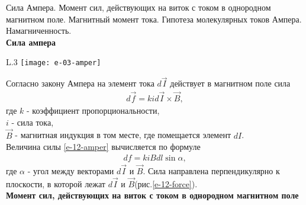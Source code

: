 \documentclass[__main__.tex]{subfiles}
\begin{document}
Сила Ампера. Момент сил, действующих на виток с током в однородном магнитном поле. Магнитный момент тока. Гипотеза молекулярных токов Ампера. Намагниченность.\\ 

\textbf{Сила ампера}\\

\begin{wrapfigure}{L}{.3\linewidth}
	\texttt{[image: e-03-amper]}
	\caption{Сила Ампера}
	\label{e-12-force}
\end{wrapfigure}
Согласно закону Ампера на элемент тока $d\vec{I}$ действует в магнитном поле сила
\begin{gather}
d\vec{f} = kid\vec{I} \times \vec{B},
\label{e-12-amper}
\end{gather}
где $k$ - коэффициент пропорциональности,\\
$i$ - сила тока,\\
$\vec{B}$ - магнитная индукция в том месте, где помещается элемент $dI$.\\
Величина силы \ref{e-12-amper} вычисляется по формуле 
\begin{gather}
df = kiBdl\sin{\alpha},
\end{gather}
где $\alpha$ - угол между векторами $d\vec{I}$ и $\vec{B}$. Сила направлена перпендикулярно к плоскости, в которой лежат $d\vec{I}$ и $\vec{B}$(рис.\ref{e-12-force}).\\

\textbf{Момент сил, действующих на виток с током в однородном магнитном поле}\\
\end{document}
